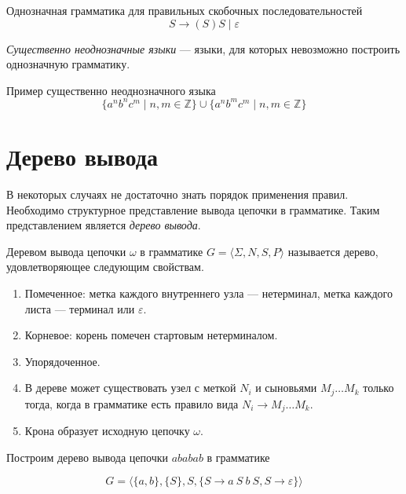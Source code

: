 \begin{example}
  Однозначная грамматика для правильных скобочных последовательностей
\[
    S \to (S)S \mid \varepsilon
\]
\end{example}

\begin{definition}
  \textit{Существенно неоднозначные языки} --- языки, для которых невозможно построить однозначную грамматику.
\end{definition}

\begin{example}
  Пример существенно неоднозначного языка
\[\{a^n b^n c^m \mid n, m \in \mathds{Z}\} \cup \{a^n b^m c^m \mid n,m \in \mathds{Z}\}\]
\end{example}

\section{Дерево вывода}\label{sect:DerivTree}
В некоторых случаях не достаточно знать порядок применения правил.
Необходимо структурное представление вывода цепочки в грамматике.
Таким представлением является \textit{дерево вывода}.
\begin{definition}
Деревом вывода цепочки $\omega$ в грамматике $G=\langle \Sigma, N, S, P \rangle$ называется дерево, удовлетворяющее следующим свойствам.

\begin{enumerate}
  \item Помеченное: метка каждого внутреннего узла --- нетерминал, метка каждого листа --- терминал или $\varepsilon$.
  \item Корневое: корень помечен стартовым нетерминалом.
  \item Упорядоченное.
  \item В дереве может существовать узел с меткой $N_i$ и сыновьями $M_j \dots M_k$ только тогда, когда в грамматике есть правило вида $N_i \to M_j \dots M_k$.
  \item Крона образует исходную цепочку $\omega$.
\end{enumerate}
\end{definition}

\begin{example}
  Построим дерево вывода цепочки $ababab$ в грамматике

  \[ G = \langle \{a,b\}, \{S\}, S, \{S \to a \ S \ b \ S, S \to \varepsilon\} \rangle \]

\begin{center}
  
\end{center}

\end{example}

